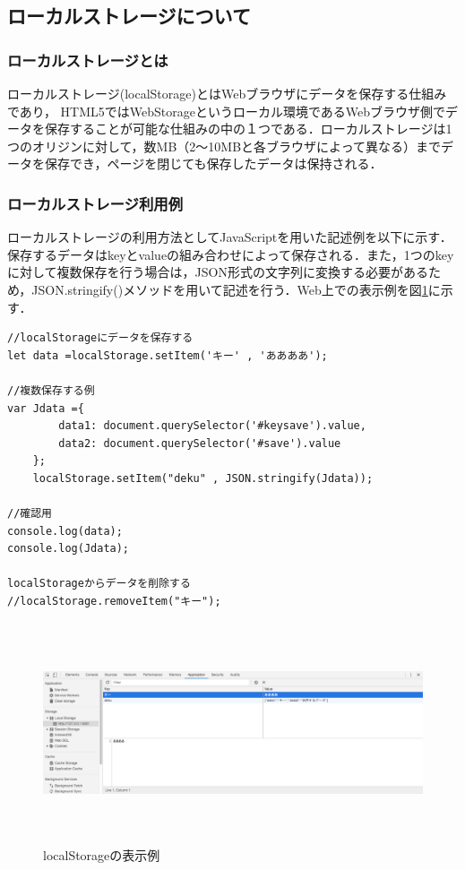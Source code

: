\documentclass[a4j,12pt]{jarticle}
\begin{document}
\subsection{ローカルストレージについて}
\subsubsection{ローカルストレージとは}
ローカルストレージ(localStorage)とはWebブラウザにデータを保存する仕組みであり， HTML5ではWebStorageというローカル環境であるWebブラウザ側でデータを保存することが可能な仕組みの中の１つである．ローカルストレージは1つのオリジンに対して，数MB（2〜10MBと各ブラウザによって異なる）までデータを保存でき，ページを閉じても保存したデータは保持される．
\subsubsection{ローカルストレージ利用例}
ローカルストレージの利用方法としてJavaScriptを用いた記述例を以下に示す．
保存するデータはkeyとvalueの組み合わせによって保存される．また，1つのkeyに対して複数保存を行う場合は，JSON形式の文字列に変換する必要があるため，JSON.stringify()メソッドを用いて記述を行う．Web上での表示例を図\ref{fig:z}に示す．
\begin{lstlisting}[caption=利用例,label=s4]
//localStorageにデータを保存する
let data =localStorage.setItem('キー' , 'ああああ');

//複数保存する例
var Jdata ={
        data1: document.querySelector('#keysave').value,
        data2: document.querySelector('#save').value
    };
    localStorage.setItem("deku" , JSON.stringify(Jdata));
 
//確認用
console.log(data);
console.log(Jdata);

localStorageからデータを削除する
//localStorage.removeItem("キー");
\end{lstlisting}
\newpage
\begin{figure}[h]
\begin{center}
 \includegraphics[clip,width=160mm,height=65mm]{figure/11localeST.png}
\end{center}
 \caption{localStorageの表示例}
 \label{fig:z}
\end{figure}
\newpage
\end{document}
